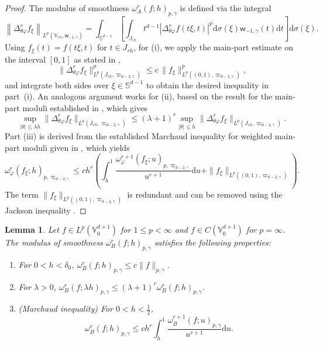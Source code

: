 \documentclass{amsart}
\newtheorem{lem}[thm]{Lemma}
\theoremstyle{remark}
\def\d{\mathrm{d}}
\def\sph{{\mathbb{S}^{d-1}}}
\def\g{{\gamma}}
\def\t{{\theta}}
\def\l{{\lambda}}
\def\o{{\omega}}
\def\VV{{\mathbb V}}
\def\d{\mathrm{d}}
\def\sph{{\mathbb{S}^{d-1}}}
\def\sw{{\mathsf w}}
\def\g{{\gamma}}
\def\t{{\theta}}
\def\l{{\lambda}}
\def\o{{\omega}}
\def\VV{{\mathbb V}}
\def\f{\frac}
\def\f{\frac}
\begin{document}
\begin{proof}
The modulus of smoothness $\omega_A^r (f;h)_{p,\g}$ is defined via the integral 
\begin{equation*}
   \left\| \Delta_{\t\varphi}^r f_\xi \right\|_{L^p( \VV_{r h},\sw_{-1,\g}) }  
	=\int_{\sph}\left [ \int_{J_{r h}} t^{d-1} |\Delta^r_{\theta \varphi } f(t\xi,t)|^p \d\sigma(\xi)  \sw_{-1,\g}(t) \d t \right]  \d\sigma(\xi) . 
\end{equation*}   
Using $f_\xi(t)= f(t\xi, t)$ for $ t\in J_{rh}$, for (i), we apply the main-part estimate on the interval $[0,1]$ 
as stated in \cite[p.~58]{DT}, 
\[
	\|\Delta_{\t\varphi}^r f_\xi\|_{L^p(J_{rh},   \varpi_{d-2,\g})}^p \leq c\, \|f_{\xi}\|_{L^p((0,1),   \varpi_{d-2,\g})}^p,
\] 
and integrate both sides over $\xi \in \mathbb{S}^{d-1}$ to obtain the desired inequality in part~(i).
An analogous argument works for (ii), based on the result for the main-part moduli established in \cite[(6.2.8)]{DT}, 
which gives
$$
	 \sup_{|\theta| \leq \lambda h} \Big\|\Delta_{\theta \varphi}^r f_\xi\Big\|_{L^p(J_{rh},  \varpi_{d-2,\g})} 
	 \leq (\lambda + 1)^r \sup_{|\theta| \leq h} \Big\|\Delta_{\theta \varphi}^r f_\xi \Big\|_{L^p(J_{rh},  \varpi_{d-2,\g})}.
$$ 
Part (iii) is derived from the established Marchaud inequality for weighted main-part moduli given in 
\cite[Theorem 6.4.2]{DT}, which yields	 
$$
	\o_\varphi^r(f_\xi; h)_{p,\varpi_{d-2,\g} }\leq c  h^r \left(\int_h^1\f{\o_\varphi ^{r+1}(f_{\xi}; u)_{p,\varpi_{d-2,\g}}}{u^{r+1}}  \d u
	 + \|f_\xi\|_{L^p((0,1),   \varpi_{d-2,\g})}\right).
$$ 
The term $\|f_\xi\|_{L^p((0,1), \varpi_{d-2,\g})}$ is redundant and can be removed using the Jackson 
inequality \cite[(8.2.1)]{DT}.
\end{proof}
	
\begin{lem}\label{prop-module}
Let $f\in L^p(\VV^{d+1}_0)$ for $1\leq p<\infty$ and $f\in C(\VV^{d+1}_0)$ for $p=\infty$. The modulus of 
smoothness $\o^r_B(f; h)_{p,\g}$ satisfies the following properties:
\begin{enumerate} [\rm  (i)]
\item For $0< h <\delta_0$, $  \o_B^r(f; h)_{p,\g}\leq c \|f\|_{p,\g }$.
\item For $\l >0$, $\o_B^r(f; \lambda h)_{p,\g }\leq (\l+1)^r \o_B^r(f; h)_{p,\g }$.
\item (Marchaud inequality) For $0<h <\f12$, 
$$
  \o_B^r(f; h)_{p,\g }\leq c  h^r\int_h^1\f{\o_B^{r+1}(f; u)_{p,\g}}{u^{r+1}}  \d u .
$$
\end{enumerate}
\end{lem}
\end{document}
